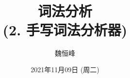 \documentclass[]{beamer}
\title[词法分析]{词法分析 \\ (2. 手写词法分析器)}
\author[魏恒峰]{\large 魏恒峰}
\institute{hfwei@nju.edu.cn}
\date{2021年11月09日 (周二)}
\begin{document}
\maketitle


\thankyou{}

\end{document}
